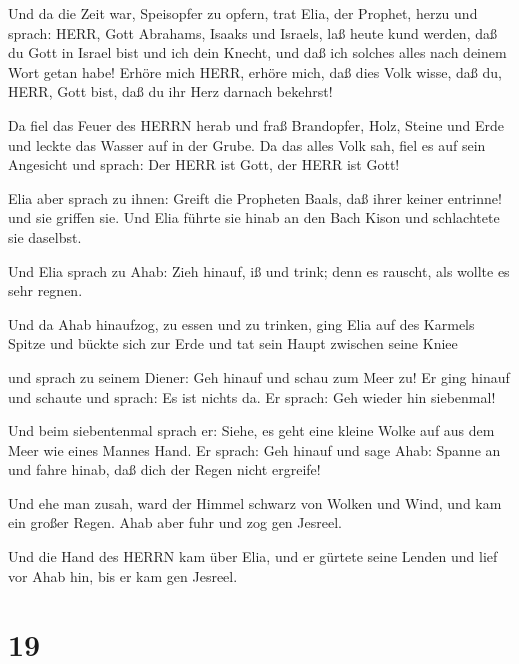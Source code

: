  Und da die Zeit war, Speisopfer zu opfern, trat Elia, der
Prophet, herzu und sprach: HERR, Gott Abrahams, Isaaks und Israels, laß
heute kund werden, daß du Gott in Israel bist und ich dein Knecht, und
daß ich solches alles nach deinem Wort getan habe!  Erhöre
mich HERR, erhöre mich, daß dies Volk wisse, daß du, HERR, Gott bist,
daß du ihr Herz darnach bekehrst!

 Da fiel das Feuer des HERRN herab und fraß Brandopfer,
Holz, Steine und Erde und leckte das Wasser auf in der Grube.
 Da das alles Volk sah, fiel es auf sein Angesicht und
sprach: Der HERR ist Gott, der HERR ist Gott!

 Elia aber sprach zu ihnen: Greift die Propheten Baals, daß
ihrer keiner entrinne! und sie griffen sie. Und Elia führte sie hinab an
den Bach Kison und schlachtete sie daselbst.

 Und Elia sprach zu Ahab: Zieh hinauf, iß und trink; denn
es rauscht, als wollte es sehr regnen.

 Und da Ahab hinaufzog, zu essen und zu trinken, ging Elia
auf des Karmels Spitze und bückte sich zur Erde und tat sein Haupt
zwischen seine Kniee

 und sprach zu seinem Diener: Geh hinauf und schau zum Meer
zu! Er ging hinauf und schaute und sprach: Es ist nichts da. Er sprach:
Geh wieder hin siebenmal!

 Und beim siebentenmal sprach er: Siehe, es geht eine
kleine Wolke auf aus dem Meer wie eines Mannes Hand. Er sprach: Geh
hinauf und sage Ahab: Spanne an und fahre hinab, daß dich der Regen
nicht ergreife!

 Und ehe man zusah, ward der Himmel schwarz von Wolken und
Wind, und kam ein großer Regen. Ahab aber fuhr und zog gen Jesreel.

 Und die Hand des HERRN kam über Elia, und er gürtete seine
Lenden und lief vor Ahab hin, bis er kam gen Jesreel.

\hypertarget{section-18}{%
\section{19}\label{section-18}}

